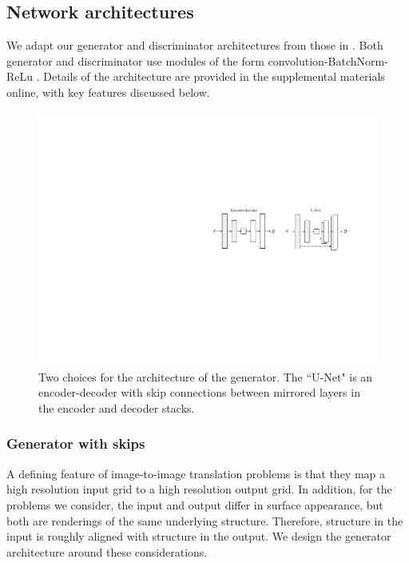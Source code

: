 \documentclass[10pt,twocolumn,letterpaper]{article}
\begin{document}
\subsection{Network architectures}

We adapt our generator and discriminator architectures from those in \cite{radford2015unsupervised}. Both generator and discriminator use modules of the form convolution-BatchNorm-ReLu \cite{ioffe2015batch}. Details of the architecture are provided in the supplemental materials online, with key features discussed below.


\begin{figure}[t]
 \centering
 \includegraphics[width=1.0\hsize]{figs/generator_arch_diagrams_v2.pdf}
  \caption{Two choices for the architecture of the generator. The ``U-Net" \cite{ronneberger2015u} is an encoder-decoder with skip connections between mirrored layers in the encoder and decoder stacks.}
 \label{generator_architecture}
\end{figure}

\subsubsection{Generator with skips}
A defining feature of image-to-image translation problems is that they map a high resolution input grid to a high resolution output grid. In addition, for the problems we consider, the input and output differ in surface appearance, but both are renderings of the same underlying structure. Therefore, structure in the input is roughly aligned with structure in the output. We design the generator architecture around these considerations.
\end{document}
